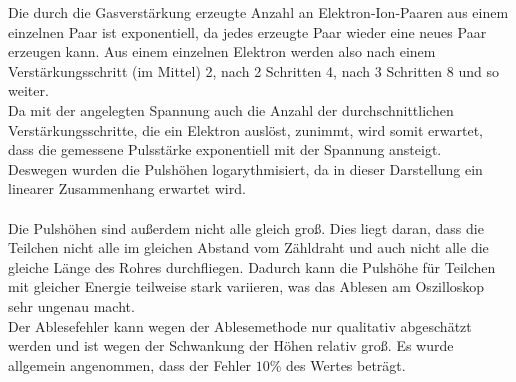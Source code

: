 \documentclass[12pt,a4paper]{article}
\begin{document}
Die durch die Gasverstärkung erzeugte Anzahl an Elektron-Ion-Paaren aus einem einzelnen Paar ist exponentiell, da jedes erzeugte Paar wieder eine neues Paar erzeugen kann. Aus einem einzelnen Elektron werden also nach einem Verstärkungsschritt (im Mittel) 2, nach 2 Schritten 4, nach 3 Schritten 8 und so weiter.\\
Da mit der angelegten Spannung auch die Anzahl der durchschnittlichen Verstärkungsschritte, die ein Elektron auslöst, zunimmt, wird somit erwartet, dass die gemessene Pulsstärke exponentiell mit der Spannung ansteigt.\\
Deswegen wurden die Pulshöhen logarythmisiert, da in dieser Darstellung ein linearer Zusammenhang erwartet wird.\\
\\
Die Pulshöhen sind außerdem nicht alle gleich groß. Dies liegt daran, dass die Teilchen nicht alle im gleichen Abstand vom Zähldraht und auch nicht alle die gleiche Länge des Rohres durchfliegen. Dadurch kann die Pulshöhe für Teilchen mit gleicher Energie teilweise stark variieren, was das Ablesen am Oszilloskop sehr ungenau macht.\\
Der Ablesefehler kann wegen der Ablesemethode nur qualitativ abgeschätzt werden und ist wegen der Schwankung der Höhen relativ groß. Es wurde allgemein angenommen, dass der Fehler $10\%$ des Wertes beträgt.
\end{document}

